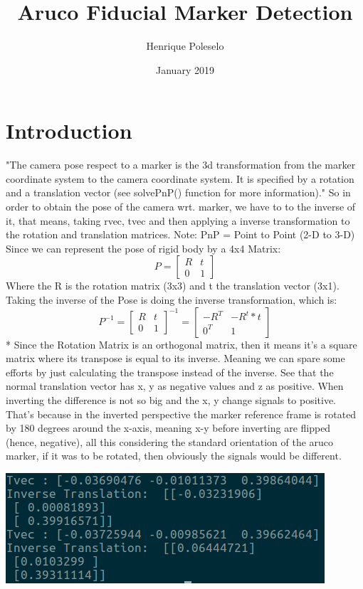 \documentclass{article}
\title{Aruco Fiducial Marker Detection}
\author{Henrique Poleselo }
\date{January 2019}
\begin{document}
\maketitle

\section{Introduction}
"The camera pose respect to a marker is the 3d transformation from the marker coordinate system to the camera coordinate system. It is specified by a rotation and a translation vector (see solvePnP() function for more information)." So in order to obtain the pose of the camera wrt. marker, we have to to the inverse of it, that means, taking rvec, tvec and then applying a inverse transformation to the rotation and translation matrices.
Note: PnP = Point to Point (2-D to 3-D)
Since we can represent the pose of rigid body by a 4x4 Matrix:
\[
P=
  \begin{bmatrix}
    R & t \\
    0 & 1
  \end{bmatrix}
\]
Where the R is the rotation matrix (3x3) and t the translation vector (3x1).
Taking the inverse of the Pose is doing the inverse transformation, which is:
\[
P^{-1}=
  \begin{bmatrix}
    R & t \\
    0 & 1
  \end{bmatrix}^{-1}
  =
  \begin{bmatrix}
  -R^T & -R^t*t \\
  0^T & 1
  \end{bmatrix}
\]
* Since the Rotation Matrix is an orthogonal matrix, then it means it’s a square matrix where its transpose is equal to its inverse. Meaning we can spare some efforts by just calculating the transpose instead of the inverse.
See that the normal translation vector has x, y as negative values and z as positive. When inverting the difference is not so big and the x, y change signals to positive. That's because in the inverted perspective the marker reference frame is rotated by 180 degrees around the x-axis, meaning x-y before inverting are flipped (hence, negative), all this considering the standard orientation of the aruco marker, if it was to be rotated, then obviously the signals would be different.
\begin{center}
  \includegraphics[scale=0.5]{pictures/invertrans.png}
\end{center}
\end{document}
